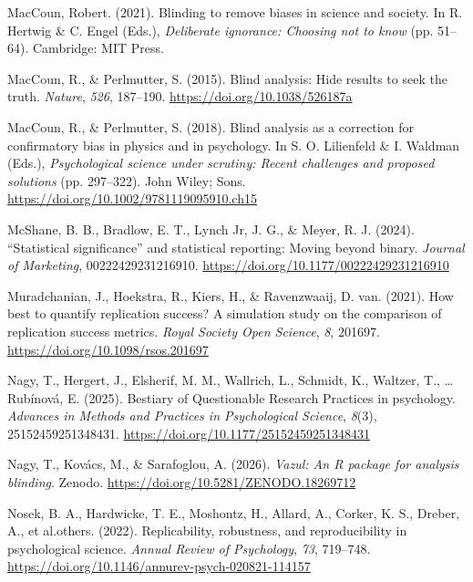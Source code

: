 \documentclass[
  english,
  man,floatsintext]{apa6}
\newlength{\cslhangindent}
\newenvironment{CSLReferences}[2] %
 {\begin{list}{}{%
  \setlength{\itemindent}{0pt}
  \setlength{\leftmargin}{0pt}
  \setlength{\parsep}{0pt}
  \ifodd #1
   \setlength{\leftmargin}{\cslhangindent}
   \setlength{\itemindent}{-1\cslhangindent}
  \fi
  \setlength{\itemsep}{#2\baselineskip}}}
 {\end{list}}
\begin{document}
\begin{CSLReferences}{1}{0}
MacCoun, Robert. (2021). Blinding to remove biases in science and society. In R. Hertwig \& C. Engel (Eds.), \emph{Deliberate ignorance: {C}hoosing not to know} (pp. 51--64). Cambridge: MIT Press.

MacCoun, R., \& Perlmutter, S. (2015). Blind analysis: {H}ide results to seek the truth. \emph{Nature}, \emph{526}, 187--190. \url{https://doi.org/10.1038/526187a}

MacCoun, R., \& Perlmutter, S. (2018). Blind analysis as a correction for confirmatory bias in physics and in psychology. In S. O. Lilienfeld \& I. Waldman (Eds.), \emph{Psychological science under scrutiny: {R}ecent challenges and proposed solutions} (pp. 297--322). John Wiley; Sons. \url{https://doi.org/10.1002/9781119095910.ch15}

McShane, B. B., Bradlow, E. T., Lynch Jr, J. G., \& Meyer, R. J. (2024). {``Statistical significance''} and statistical reporting: Moving beyond binary. \emph{Journal of Marketing}, 00222429231216910. \url{https://doi.org/10.1177/00222429231216910}

Muradchanian, J., Hoekstra, R., Kiers, H., \& Ravenzwaaij, D. van. (2021). How best to quantify replication success? {A} simulation study on the comparison of replication success metrics. \emph{Royal Society Open Science}, \emph{8}, 201697. \url{https://doi.org/10.1098/rsos.201697}

Nagy, T., Hergert, J., Elsherif, M. M., Wallrich, L., Schmidt, K., Waltzer, T., \ldots{} Rubínová, E. (2025). Bestiary of {Questionable} {Research} {Practices} in psychology. \emph{Advances in Methods and Practices in Psychological Science}, \emph{8}(3), 25152459251348431. \url{https://doi.org/10.1177/25152459251348431}

Nagy, T., Kovács, M., \& Sarafoglou, A. (2026). \emph{Vazul: An {R} package for analysis blinding}. Zenodo. \url{https://doi.org/10.5281/ZENODO.18269712}

Nosek, B. A., Hardwicke, T. E., Moshontz, H., Allard, A., Corker, K. S., Dreber, A., et al.others. (2022). Replicability, robustness, and reproducibility in psychological science. \emph{Annual Review of Psychology}, \emph{73}, 719--748. \url{https://doi.org/10.1146/annurev-psych-020821-114157}


\end{CSLReferences}
\end{document}
